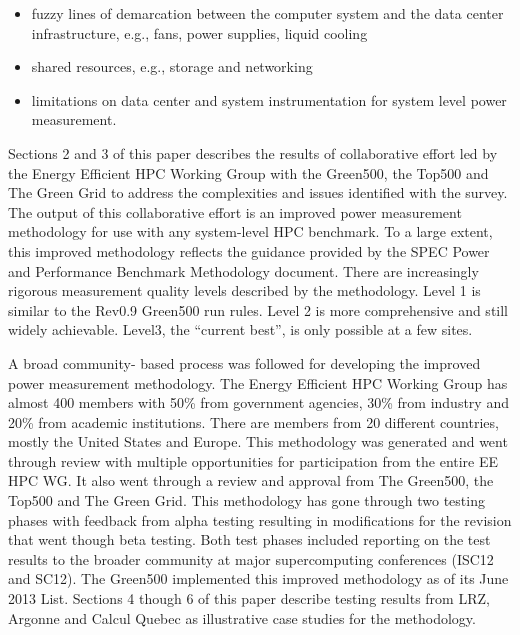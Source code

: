 \begin{itemize}

    \item fuzzy lines of demarcation between the computer system and the data
        center infrastructure, e.g., fans, power supplies, liquid cooling

    \item shared resources, e.g., storage and networking

    \item limitations on data center and system instrumentation for system
        level power measurement.

\end{itemize}


Sections 2 and 3 of this paper describes the results of collaborative effort led by
the Energy Efficient HPC Working Group with the Green500, the Top500 and The
Green Grid to address the complexities and issues identified with the survey. The
output of this collaborative effort is an improved power measurement methodology
for use with any system-level HPC benchmark. To a large extent, this improved
methodology reflects the guidance provided by the SPEC Power and Performance
Benchmark Methodology document. There are increasingly rigorous measurement
quality levels described by the methodology. Level 1 is similar to the Rev0.9
Green500 run rules. Level 2 is more comprehensive and still widely achievable.
Level3, the ``current best'', is only possible at a few sites.

A broad community- based process was followed for developing the improved
power measurement methodology. The Energy Efficient HPC Working Group has
almost 400 members with 50\% from government agencies, 30\% from industry and
20\% from academic institutions. There are members from 20 different
countries, mostly the United States and Europe. This methodology was
generated and went through review with multiple opportunities for
participation from the entire EE HPC WG. It also went through a review and
approval from The Green500, the Top500 and The Green Grid. This methodology
has gone through two testing phases with feedback from alpha testing resulting
in modifications for the revision that went though beta testing. Both test
phases included reporting on the test results to the broader community at
major supercomputing conferences (ISC12 and SC12). The Green500 implemented
this improved methodology as of its June 2013 List. Sections 4 though 6 of
this paper describe testing results from LRZ, Argonne and Calcul Quebec as
illustrative case studies for the methodology.

